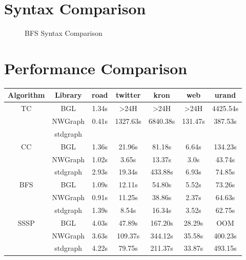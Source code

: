 
\clearpage

\section{Syntax Comparison} \label{syntax}
\begin{figure}[ht]
\noindent\begin{minipage}{.48\textwidth}
{\small
      
}
\end{minipage}\hfill
\begin{minipage}{.48\textwidth}
{\small
      
}
\end{minipage}
\caption{BFS Syntax Comparison}
\end{figure}

\section{Performance Comparison} \label{performance}
\centering
\begin{tabular}{ c c c c c c c }
Algorithm & Library & road & twitter & kron & web & urand \\
\hline
\multirow{3}{*}{TC} & BGL & 1.34s & >24H & >24H & >24H & 4425.54s \\
& NWGraph & 0.41s & 1327.63s & 6840.38s & 131.47s & 387.53s \\
& stdgraph & & & & & \\
\hline
\multirow{3}{*}{CC} & BGL & 1.36s & 21.96s & 81.18s & 6.64s & 134.23s \\
& NWGraph & 1.02s & 3.65s & 13.37s & 3.0s & 43.74s \\
& stdgraph & 2.93s & 19.34s & 433.88s & 6.93s & 74.85s \\
\hline
\multirow{3}{*}{BFS} & BGL & 1.09s & 12.11s & 54.80s & 5.52s & 73.26s \\
& NWGraph & 0.91s & 11.25s & 38.86s & 2.37s & 64.63s \\
& stdgraph & 1.39s & 8.54s & 16.34s & 3.52s & 62.75s \\
\hline
\multirow{3}{*}{SSSP} & BGL & 4.03s & 47.89s & 167.20s & 28.29s & OOM \\
& NWGraph & 3.63s & 109.37s & 344.12s & 35.58s & 400.23s \\
& stdgraph & 4.22s & 79.75s & 211.37s & 33.87s & 493.15s \\
\hline
\end{tabular}
